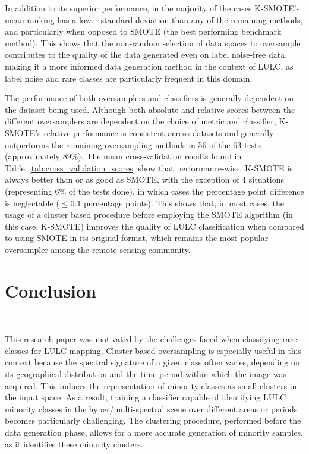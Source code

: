 \documentclass[remotesensing,article,submit,moreauthors,pdftex]{Definitions/mdpi}
\begin{document}
\begin{paracol}{2}
{In addition to its superior performance, in the majority of the cases
K-SMOTE's mean ranking has a lower standard deviation than any of the
remaining methods, and particularly when opposed to SMOTE (the best performing
benchmark method). This shows that the non-random selection of data spaces to
oversample contributes to the quality of the data generated even on label
noise-free data, making it a more informed data generation method in the
context of LULC, as label noise and rare classes are particularly frequent in
this domain. 

The performance of both oversamplers and classifiers is generally dependent on
the dataset being used. Although both absolute and relative scores between the
different oversamplers are dependent on the choice of metric and classifier,
K-SMOTE's relative performance is consistent across datasets and generally
outperforms the remaining oversampling methods in 56 of the 63 tests
(approximately 89\%). The mean cross-validation results found in
Table~\ref{tab:cross_validation_scores} show that performance-wise, K-SMOTE is
always better than or as good as SMOTE, with the exception of 4 situations
(representing 6\% of the tests done), in which cases the percentage point
difference is neglectable ($\leq 0.1$ percentage points). This shows that, in
most cases, the usage of a cluster based procedure before employing the SMOTE
algorithm (in this case, K-SMOTE) improves the quality of LULC classification
when compared to using SMOTE in its original format, which remains the
most popular oversampler among the remote sensing community.

}

\section{Conclusion}~\label{sec:conclusion} 

This research paper was motivated by the challenges faced when classifying
rare classes for LULC mapping. Cluster-based oversampling is especially
useful in this context because the spectral signature of a given class often
varies, depending on its geographical distribution and the time period within
which the image was acquired. This induces the representation of minority
classes as small clusters in the input space. As a result, training a
classifier capable of identifying LULC minority classes in the
hyper/multi-spectral scene over different areas or periods becomes
particularly challenging. The clustering procedure, performed before the data
generation phase, allows for a more accurate generation of minority samples,
as it identifies these minority clusters.


\end{paracol}
\end{document}

